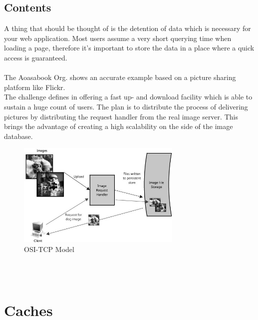 \documentclass[12p]{article}
\begin{document}
	\subsection{Contents}
	A thing that should be thought of is the detention of data which is necessary for your web application. Most users assume a very short querying time when loading a page, therefore it's important to store the data in a place where a quick access is guaranteed.\\
	\\
	The Aoasabook Org. shows an accurate example based on a picture sharing platform like Flickr.\\
	The challenge defines in offering a fast up- and download facility which is able to sustain a huge count of users. The plan is to distribute the process of delivering pictures by distributing the request handler from the real image server. This brings the advantage of creating a high scalability on the side of the image database.
	\begin{figure}[h!]
		\centering
		\includegraphics[width=0.7\textwidth]{img/appLayerImage1.jpg}
		\caption{OSI-TCP Model \cite{cache}}
	\end{figure}
	\\\\
	
	\newpage
	\section{Caches}
	
\end{document}
